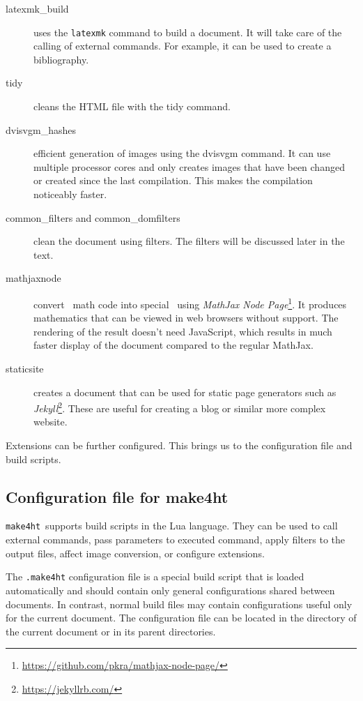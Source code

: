 \documentclass{ltugproc}
\newcommand\term[1]{\textit{#1}}
\newcommand\command[1]{\texttt{#1}}
\newcommand\makefourht{\command{make4ht}}
\newcommand\extension[1]{\texttt{.#1}}
\begin{document}
\begin{description}
  \item[latexmk\_build] uses the \command{latexmk} command to build a document. It will take care of the  calling of external commands. For example, it can be used to create a bibliography.

  \item[tidy] cleans the HTML file with the tidy command.

  \item[dvisvgm\_hashes] efficient generation of images using the dvisvgm command. It can use multiple processor cores and only creates images that have been changed or created since the last compilation. This makes the compilation noticeably faster.  

  \item[common\_filters and common\_domfilters]
clean the document using filters. The filters will be discussed later in the  text.

\item[mathjaxnode] convert \MathML\ math code into special \HTML\ using
  \term{MathJax Node Page}\footnote{\url{https://github.com/pkra/mathjax-node-page/}}.
  It produces mathematics that can be viewed in web browsers without \MathML
    support. The rendering of the result doesn't need JavaScript, which results in much faster display of the document compared  to the regular MathJax.

\item[staticsite] creates a document that can be used for static page generators such as \term{Jekyll}\footnote{\url{https://jekyllrb.com/}}. These are useful for creating a blog or similar more complex website.
\end{description}
    

Extensions can be further configured. This brings us to the configuration file and build scripts. 



\subsection{Configuration file for make4ht}

\makefourht\ supports build scripts in the  Lua language. They can be used to
call external commands, pass parameters to executed command, apply filters to
the output files, affect image conversion, or configure extensions.

The \extension{make4ht} configuration file is a special build script that is loaded
automatically and should contain only general configurations shared between documents. In contrast,
normal build files may contain configurations useful only for the current document. The
configuration file can be located in the  directory of the current   document or in  its
parent directories. 
\end{document}
